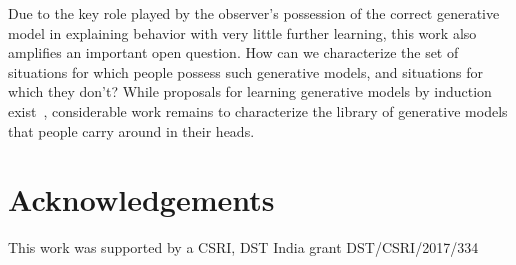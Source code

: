\documentclass[10pt,letterpaper]{article}
\begin{document}

Due to the key role played by the observer's possession of the correct generative model in explaining behavior with very little further learning, this work also amplifies an important open question. How can we characterize the set of situations for which people possess such generative models, and situations for which they don't? While proposals for learning generative models by induction exist~\cite{kemp2008discovery, tenenbaum2011grow}, considerable work remains to characterize the library of generative models that people carry around in their heads. 

\section{Acknowledgements}
This work was supported by a CSRI, DST India grant DST/CSRI/2017/334



\setlength{\bibleftmargin}{.125in}
\setlength{\bibindent}{-\bibleftmargin}


\end{document}
